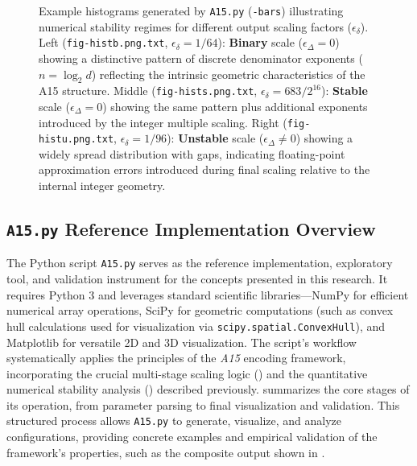 \documentclass[10pt]{article}
\def\AAAB{\textit{A15}}
\begin{document}
\begin{figure}[!htb]
    \caption{Example histograms generated by \texttt{A15.py} (\texttt{-bars}) illustrating numerical stability regimes for different output scaling factors ($\epsilon_\delta$). Left (\texttt{fig-histb.png.txt}, $\epsilon_\delta=1/64$): \textbf{Binary} scale ($\epsilon_\Delta=0$) showing a distinctive pattern of discrete denominator exponents ($n = \log_2 d$) reflecting the intrinsic geometric characteristics of the A15 structure. Middle (\texttt{fig-hists.png.txt}, $\epsilon_\delta=683/2^{16}$): \textbf{Stable} scale ($\epsilon_\Delta=0$) showing the same pattern plus additional exponents introduced by the integer multiple scaling. Right (\texttt{fig-histu.png.txt}, $\epsilon_\delta=1/96$): \textbf{Unstable} scale ($\epsilon_\Delta \neq 0$) showing a widely spread distribution with gaps, indicating floating-point approximation errors introduced during final scaling relative to the internal integer geometry.}
    \label{fig-hist}
\end{figure}

\subsection{\texttt{A15.py} Reference Implementation Overview}\label{subsec-implementation-a15py}

The Python script \texttt{A15.py} \cite{Risinger2024A15} serves as the reference implementation, exploratory tool, and validation instrument for the concepts presented in this research. It requires Python 3 and leverages standard scientific libraries—NumPy \cite{Harris2020} for efficient numerical array operations, SciPy \cite{Virtanen2020} for geometric computations (such as convex hull calculations used for visualization via \texttt{scipy.spatial.ConvexHull}), and Matplotlib \cite{Hunter2007} for versatile 2D and 3D visualization. The script's workflow systematically applies the principles of the \AAAB{} encoding framework, incorporating the crucial multi-stage scaling logic () and the quantitative numerical stability analysis () described previously.  summarizes the core stages of its operation, from parameter parsing to final visualization and validation. This structured process allows \texttt{A15.py} to generate, visualize, and analyze configurations, providing concrete examples and empirical validation of the framework's properties, such as the composite output shown in .
\end{document}
